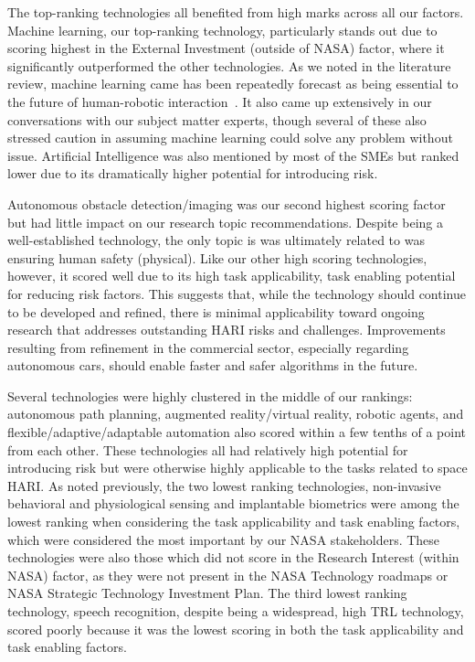 The top-ranking technologies all benefited from high marks across all our factors.
Machine learning, our top-ranking technology, particularly stands out due to scoring highest in the External Investment (outside of NASA) factor, where it significantly outperformed the other technologies.
As we noted in the literature review, machine learning came has been repeatedly forecast as being essential to the future of human-robotic interaction~\citep{wang_current_2018}.
It also came up extensively in our conversations with our subject matter experts, though several of these also stressed caution in assuming machine learning could solve any problem without issue.
Artificial Intelligence was also mentioned by most of the SMEs but ranked lower due to its dramatically higher potential for introducing risk.

Autonomous obstacle detection/imaging was our second highest scoring factor but had little impact on our research topic recommendations.
Despite being a well-established technology, the only topic is was ultimately related to was ensuring human safety (physical).
Like our other high scoring technologies, however, it scored well due to its high task applicability, task enabling potential for reducing risk factors.
This suggests that, while the technology should continue to be developed and refined, there is minimal applicability toward ongoing research that addresses outstanding HARI risks and challenges.
Improvements resulting from refinement in the commercial sector, especially regarding autonomous cars, should enable faster and safer algorithms in the future.

Several technologies were highly clustered in the middle of our rankings: autonomous path planning, augmented reality/virtual reality, robotic agents, and flexible/adaptive/adaptable automation also scored within a few tenths of a point from each other.
These technologies all had relatively high potential for introducing risk but were otherwise highly applicable to the tasks related to space HARI.
As noted previously, the two lowest ranking technologies, non-invasive behavioral and physiological sensing and implantable biometrics were among the lowest ranking when considering the task applicability and task enabling factors, which were considered the most important by our NASA stakeholders.
These technologies were also those which did not score in the Research Interest (within NASA) factor, as they were not present in the NASA Technology roadmaps or NASA Strategic Technology Investment Plan.
The third lowest ranking technology, speech recognition, despite being a widespread, high TRL technology, scored poorly because it was the lowest scoring in both the task applicability and task enabling factors.

